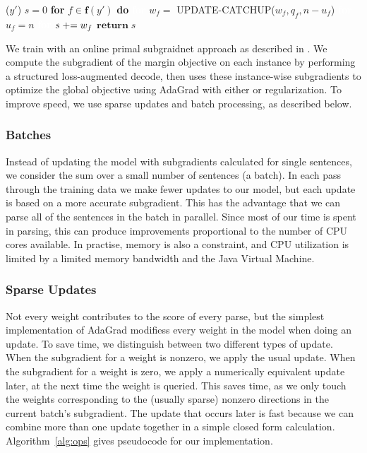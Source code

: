 \begin{algorithm}
\begin{multicols}{2}
\begin{algorithmic}[]
\begin{lefttopbot}[style=mdftight]
    ($y'$)
        \State $s = 0$
        \State \textbf{for} $f \in \mathbf{f}(y')$ \textbf{do}
        \State \textcolor{white}{\textbf{for}} $w_f = $ UPDATE-CATCHUP($w_f, q_f, n - u_f$)
        \State \textcolor{white}{\textbf{for}} $u_f = n$
        \State \textcolor{white}{\textbf{for}} $s \mathrel{+}= w_f$
        \State $\mathbf{return} \; s$
    \EndMyFunction
    \vspace{-3mm}
    \end{lefttopbot}
\end{algorithmic}
\end{multicols}
\vspace{-12mm}
\end{algorithm}

We train with an online primal subgraidnet approach \parencite{Ratliff:2007} as described in \textcite{Kummerfeld-etal:2015:EMNLP}.
We compute the subgradient of the margin objective on each instance by performing a structured loss-augmented decode, then uses these instance-wise subgradients to optimize the global objective using AdaGrad \parencite{Duchi:2011} with either \Lone or \Ltwo regularization.
To improve speed, we use sparse updates and batch processing, as described below.

\subsubsection{Batches}

Instead of updating the model with subgradients calculated for single sentences, we consider the sum over a small number of sentences (a batch).
In each pass through the training data we make fewer updates to our model, but each update is based on a more accurate subgradient.
This has the advantage that we can parse all of the sentences in the batch in parallel.
Since most of our time is spent in parsing, this can produce improvements proportional to the number of CPU cores available.
In practise, memory is also a constraint, and CPU utilization is limited by a limited memory bandwidth and the Java Virtual Machine.

\subsubsection{Sparse Updates}

Not every weight contributes to the score of every parse, but the simplest implementation of AdaGrad modifiess every weight in the model when doing an update.
To save time, we distinguish between two different types of update.
When the subgradient for a weight is nonzero, we apply the usual update.
When the subgradient for a weight is zero, we apply a numerically equivalent update later, at the next time the weight is queried.
This saves time, as we only touch the weights corresponding to the (usually sparse) nonzero directions in the current batch's subgradient.
The update that occurs later is fast because we can combine more than one update together in a simple closed form calculation.
Algorithm~\ref{alg:ops} gives pseudocode for our implementation.

